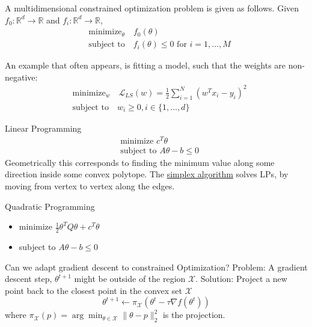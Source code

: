\documentclass[12 pt]{article}        	%
\begin{document}
\begin{defi}
    A multidimensional constrained optimization problem is given as follows.
    Given $ f_0 \colon \mathbb{ R }^d \to \mathbb{ R } $ and $ f_i \colon \mathbb{ R }^d \to \mathbb{ R } $,
    \begin{align*}
        &\text{minimize}_{\theta} \quad f_0 ( \theta )
        \\
        &\text{subject to} \quad f_i ( \theta ) \leq 0 \text{ for } i =  1 , \dotsc , M 
    \end{align*}
\end{defi}

\begin{exmp}
    An example that often appears, is fitting a model, such that the weights are non-negative:
    \begin{align*}
        &\text{minimize}_w \quad \mathcal{ L }_{ LS } ( w ) = \frac{ 1 }{ 2 } \sum_{ i = 1 }^N ( w^T x_i - y_i )^2
        \\
        &\text{subject to} \quad w_i \geq 0 , i \in \{ 1 , \dotsc , d \}
    \end{align*}
\end{exmp}

\begin{exmp}
    Linear Programming
    \begin{align*}
        &\text{minimize }  c^T \theta 
        \\
        &\text{subject to }  A \theta - b \leq 0 
    \end{align*}
Geometrically this corresponds to finding the minimum value along some direction inside some convex polytope.
The \underline{simplex algorithm} solves LPs, by moving from vertex to vertex along the edges.
\end{exmp}

\begin{exmp}
    Quadratic Programming
    \begin{itemize}
        \item 
        minimize $ \frac{1}{2} \theta^T Q \theta + c^T \theta $

        \item 
        subject to $ A \theta - b \leq  0 $
    \end{itemize}
\end{exmp}

Can we adapt gradient descent to constrained Optimization?
Problem: A gradient descent step, $ \theta^{ t + 1 } $ might be outside of the region $  \mathcal{ X } $.
Solution: Project a new point back to the closest point in the convex set $ \mathcal{ X } $ 
\[
    \theta^{ t + 1 } \leftarrow \pi_{ \mathcal{ X } } ( \theta^t - \tau \nabla f ( \theta^t ) ) 
\]
where $ \pi_{ \mathcal{ X } } ( p ) = \arg \min_{ \theta \in \mathcal{ X } } \lVert \theta - p \rVert_2^2 $ is the projection.
\end{document}
